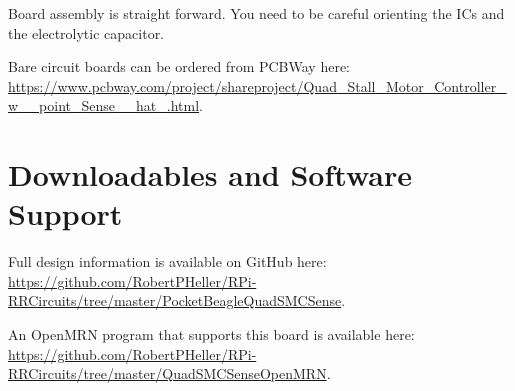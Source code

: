 Board assembly is straight forward. You need to be careful orienting the ICs
and the electrolytic capacitor.

Bare circuit boards can be ordered from PCBWay here: 
\url{https://www.pcbway.com/project/shareproject/Quad_Stall_Motor_Controller_w__point_Sense__hat_.html}.

\section{Downloadables and Software Support}

Full design information is available on GitHub here:
\url{https://github.com/RobertPHeller/RPi-RRCircuits/tree/master/PocketBeagleQuadSMCSense}.

An OpenMRN program that supports this board is available here:
\url{https://github.com/RobertPHeller/RPi-RRCircuits/tree/master/QuadSMCSenseOpenMRN}.



